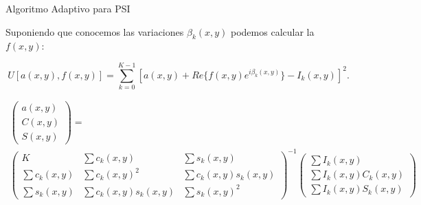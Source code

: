 \documentclass[]{beamer}
\begin{document}
\begin{frame}{Algoritmo Adaptivo para PSI}

Suponiendo que conocemos las variaciones $\beta_k(x,y)$ podemos
calcular la $f(x,y)$:
\begin{center}

\begin{equation}
  U[a(x,y),f(x,y)]=\sum_{k=0}^{K-1}[a(x,y) + Re\{f(x,y) e^{i\beta_k (x,y)} \} -
I_k (x,y)]^2.
\end{equation}

\scriptsize{
\begin{multline*}
\left(\begin{array}{c}
a(x,y)\\
C(x,y)\\
S(x,y)
\end{array}\right) = \\
\left(\begin{array}{ccc}
K & \sum c_{k}(x,y) & \sum s_{k}(x,y)\\
\sum c_{k}(x,y) & \sum c_{k}(x,y)^{2} & \sum c_{k}(x,y)s_{k}(x,y)\\
\sum s_{k}(x,y) & \sum c_{k}(x,y)s_{k}(x,y) & \sum s_{k}(x,y)^{2}
\end{array}\right)^{-1}
\left(\begin{array}{c}
\sum I_{k}(x,y)\\
\sum I_{k}(x,y)C_{k}(x,y)\\
\sum I_{k}(x,y)S_{k}(x,y)
\end{array}\right)
\end{multline*}
}

\end{center}
\end{frame}
\end{document}
